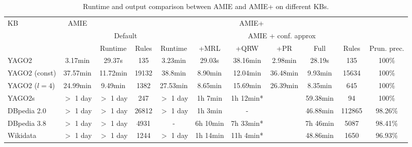 \begin{center}
\begin{savenotes}
\begin{table}[t]
\footnotesize
\begin{tabular}{|l|c|c|c|c|c|c|c|c|c|c|}
\hline
\multirow{3}{*}{KB} 	& \multirow{3}{*}{AMIE}  	& \multicolumn{9}{c|}{AMIE+} 	\\ \cline{3-11}
 			& 				& \multicolumn{2}{c|}{Default}	& \multicolumn{7}{c|}{AMIE + conf. approx}   \\ \cline{3-11}
			&  				&Runtime	& Rules 	& Runtime  & +MRL     &+QRW 	&+PR		& Full	   	   & Rules	& Prun. prec. 	   \\ \hline
  YAGO2  		& 3.17min  			&29.37s		& 135		& 3.23min  & 29.03s   &38.16min &2.98min  	& 28.19s	   & 135 	& 100\%      	    \\ \hline
  YAGO2 (const)  	& 37.57min  			&11.72min	& 19132		& 38.8min  & 8.90min  &12.04min &36.48min  	& 9.93min	   & 15634	& 100\% 	    \\ \hline  
  YAGO2 ($l=4$)  	& 24.99min  			&9.49min	& 1382		& 27.53min & 8.65min  &15.69min &26.39min  	& 8.35min 	   & 645	& 100\%   	    \\ \hline
  YAGO2s  		& $>$ 1 day  			&$>$ 1 day	& 247		&$>$ 1 day & 1h 7min  &1h 12min*&  		& 59.38min	   & 94	 	& 100\%		    \\ \hline
  DBpedia 2.0  		& $>$ 1 day  			&$>$ 1 day	& 26812		&$>$ 1 day & 1h 3min  & -       &  		& 46.88min	   & 112865	& 98.26\%      	    \\ \hline
  DBpedia 3.8  		& $>$ 1 day  			&$>$ 1 day	& 4931		& - 	   & 6h 10min &7h 33min*&  		& 7h 46min 	   & 5087       & 98.41\%	    \\ \hline
  Wikidata  		& $>$ 1 day  			&$>$ 1 day	& 1244		&$>$ 1 day & 1h 14min &11h 4min*&  		& 48.86min	   & 1650	& 96.93\%      	    \\ \hline

\end{tabular}
\caption{Runtime and output comparison between AMIE and AMIE+ on different KBs. }
\label{amievsplus}
\end{table}
\end{savenotes}
\end{center}

